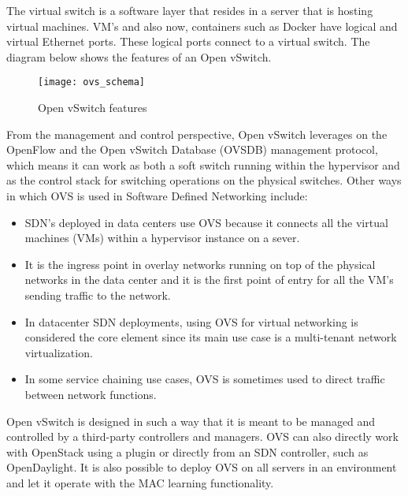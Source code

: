 The virtual switch is a software layer that resides in a server that is hosting virtual machines. VM’s and also now, containers such as Docker have logical and virtual Ethernet ports. These logical ports connect to a virtual switch. The diagram below shows the features of an Open vSwitch. \cite{WhatisOVS}
\begin{figure}[H]
	\centering
	\texttt{[image: ovs\_schema]}
	\caption{Open vSwitch features \cite{ovs_features}} \label{fig:OVS_Features}
	\vspace{-10pt}
\end{figure}

From the management and control perspective, Open vSwitch leverages on the OpenFlow and the Open vSwitch Database (OVSDB) management protocol, which means it can work as both a soft switch running within the hypervisor and as the control stack for switching operations on the physical switches. Other ways in which OVS is used in Software Defined Networking include:

\begin{itemize}
	\item SDN’s deployed in data centers use OVS because it connects all the virtual machines (VMs) within a hypervisor instance on a sever.
	\item It is the ingress point in overlay networks running on top of the physical networks in the data center and it is the first point of entry for all the VM’s sending traffic to the network.
	\item In datacenter SDN deployments, using OVS for virtual networking is considered the core element since its main use case is a multi-tenant network virtualization.
	\item In some service chaining use cases, OVS is sometimes used to direct traffic between network functions.
	
\end{itemize}

Open vSwitch is designed in such a way that it is meant to be managed and controlled by a third-party controllers and managers. OVS can also directly work with OpenStack using a plugin or directly from an SDN controller, such as OpenDaylight. It is also possible to deploy OVS on all servers in an environment and let it operate with the MAC learning functionality. 